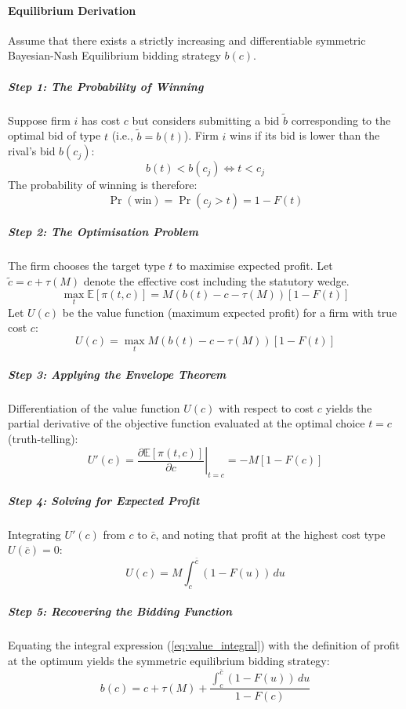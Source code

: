 \documentclass[12pt]{article}
\begin{document}
\paragraph{Equilibrium Derivation}
Assume that there exists a strictly increasing and differentiable symmetric Bayesian-Nash Equilibrium bidding strategy $b(c)$.

\subparagraph{Step 1: The Probability of Winning}
Suppose firm $i$ has cost $c$ but considers submitting a bid $\tilde{b}$ corresponding to the optimal bid of type $t$ (i.e., $\tilde{b} = b(t)$). Firm $i$ wins if its bid is lower than the rival's bid $b(c_j)$:
\begin{equation}
    b(t) < b(c_j) \iff t < c_j
\end{equation}
The probability of winning is therefore:
\begin{equation}
    \Pr(\text{win}) = \Pr(c_j > t) = 1 - F(t)
\end{equation}

\subparagraph{Step 2: The Optimisation Problem}
The firm chooses the target type $t$ to maximise expected profit. Let $\tilde{c} = c + \tau(M)$ denote the effective cost including the statutory wedge.
\begin{equation}
    \max_{t} \mathbb{E}[\pi(t, c)] = M(b(t) - c - \tau(M))[1 - F(t)]
\end{equation}
Let $U(c)$ be the value function (maximum expected profit) for a firm with true cost $c$:
\begin{equation}
    U(c) = \max_{t} M(b(t) - c - \tau(M))[1 - F(t)]
\end{equation}

\subparagraph{Step 3: Applying the Envelope Theorem}
Differentiation of the value function $U(c)$ with respect to cost $c$ yields the partial derivative of the objective function evaluated at the optimal choice $t=c$ (truth-telling):
\begin{equation}
    U'(c) = \left. \frac{\partial \mathbb{E}[\pi(t, c)]}{\partial c} \right|_{t=c} = -M[1 - F(c)]
\end{equation}

\subparagraph{Step 4: Solving for Expected Profit}
Integrating $U'(c)$ from $c$ to $\bar{c}$, and noting that profit at the highest cost type $U(\bar{c}) = 0$:
\begin{equation} \label{eq:value_integral}
    U(c) = M \int_{c}^{\bar{c}} (1 - F(u)) \, du
\end{equation}

\subparagraph{Step 5: Recovering the Bidding Function}
Equating the integral expression (\ref{eq:value_integral}) with the definition of profit at the optimum yields the symmetric equilibrium bidding strategy:
\begin{equation} \label{eq:bid_function}
    b(c) = c + \tau(M) + \frac{\int_{c}^{\bar{c}} (1 - F(u)) \, du}{1 - F(c)}
\end{equation}
\end{document}
